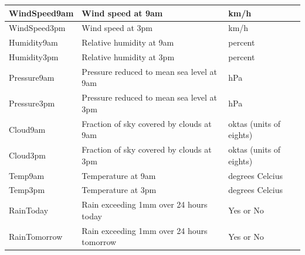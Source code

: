\documentclass[11pt]{article}
\begin{document}
\begin{table}[H]
\begin{small}
\begin{center}
\begin{tabular}{|l|l|l|}
                \hline
                WindSpeed9am     & Wind speed at 9am                                    & km/h                    \\
                \hline
                WindSpeed3pm     & Wind speed at 3pm                                    & km/h                    \\
                \hline
                Humidity9am      & Relative humidity at 9am                             & percent                 \\
                \hline
                Humidity3pm      & Relative humidity at 3pm                             & percent                 \\
                \hline
                Pressure9am      & Pressure reduced to mean sea level at 9am            & hPa                     \\
                \hline
                Pressure3pm      & Pressure reduced to mean sea level at 3pm            & hPa                     \\
                \hline
                Cloud9am         & Fraction of sky covered by clouds at 9am             & oktas (units of eights) \\
                \hline
                Cloud3pm         & Fraction of sky covered by clouds at 3pm             & oktas (units of eights) \\
                \hline
                Temp9am          & Temperature at 9am                                   & degrees Celcius         \\
                \hline
                Temp3pm          & Temperature at 3pm                                   & degrees Celcius         \\
                \hline
                RainToday        & Rain exceeding 1mm over 24 hours today               & Yes or No               \\
                \hline
                RainTomorrow     & Rain exceeding 1mm over 24 hours tomorrow            & Yes or No               \\
                \hline
            \end{tabular}
        \end{center}
    \end{small}
\end{table}
\end{document}
